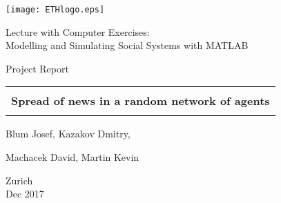 
\thispagestyle{empty}

\begin{center}
\texttt{[image: ETHlogo.eps]}

\bigskip


\bigskip


\bigskip


\LARGE{ 	Lecture with Computer Exercises:\\ }
\LARGE{ Modelling and Simulating Social Systems with MATLAB\\}

\bigskip

\bigskip

\small{Project Report}\\

\bigskip

\bigskip

\bigskip

\bigskip


\begin{tabular}{|c|}
\hline
\\
\textbf{\LARGE{Spread of news in a random network of agents}}\\
\\
\hline
\end{tabular}
\bigskip

\bigskip

\bigskip

\LARGE{Blum Josef, Kazakov Dmitry,
	
	Machacek David, Martin Kevin}



\bigskip

\bigskip

\bigskip

\bigskip

\bigskip

\bigskip

\bigskip

\bigskip

Zurich\\
Dec 2017\\

\end{center}


